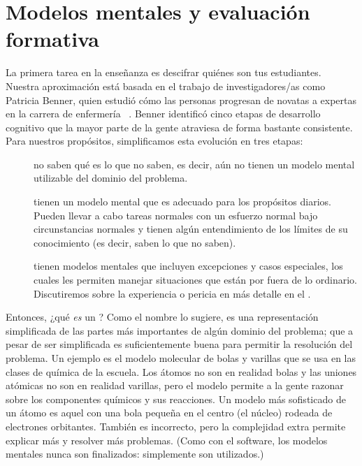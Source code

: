 \chapter{Modelos mentales y evaluación formativa}\label{s:models}

La primera tarea en la enseñanza es descifrar quiénes son tus estudiantes.
Nuestra aproximación está basada en el trabajo de investigadores/as como Patricia Benner,
quien estudió cómo las personas progresan de novatas a expertas en la carrera de enfermería ~\cite{Benn2000}.
Benner identificó cinco etapas de desarrollo cognitivo que la mayor parte de la gente atraviesa de forma bastante consistente.
Para nuestros propósitos, simplificamos esta evolución en tres etapas:

\begin{description}

\item[]
no saben qué es lo que no saben,
es decir, aún no tienen un modelo mental utilizable del dominio del problema.  

\item[]
tienen un modelo mental que es adecuado para los propósitos diarios.
Pueden llevar a cabo tareas normales con un esfuerzo normal bajo circunstancias normales
y tienen algún entendimiento de los límites de su conocimiento
(es decir, saben lo que no saben).

\item[]
  tienen modelos mentales que incluyen excepciones y casos especiales,
  los cuales les permiten manejar situaciones que están por fuera de lo ordinario.
Discutiremos sobre la experiencia o pericia en más detalle en el .

\end{description}

Entonces, ¿qué \emph{es} un ?
Como el nombre lo sugiere,
es una representación simplificada de las partes más importantes de algún dominio del problema;
que a pesar de ser simplificada es suficientemente buena para permitir la resolución del problema.
Un ejemplo es el modelo molecular de bolas y varillas que se usa en las clases de química de la escuela.
Los átomos no son en realidad bolas
y las uniones atómicas no son en realidad varillas,
pero el modelo permite a la gente razonar sobre los componentes químicos y sus reacciones.
Un modelo más sofisticado de un átomo es aquel con una bola pequeña en el centro (el núcleo) rodeada de electrones orbitantes. 
También es incorrecto,
pero la complejidad extra permite explicar más y resolver más problemas.
(Como con el software, 
los modelos mentales nunca son finalizados:
simplemente son utilizados.)

